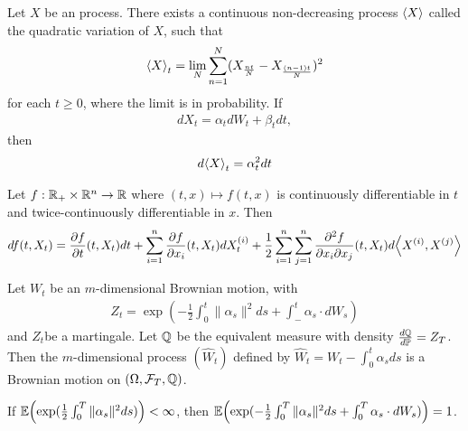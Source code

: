 \begin{thm}
  \label{sec:brown-moti-stoch-9}
  Let $X$ be an \ito process. There exists a continuous non-decreasing
  process $\IP{X}$ called the quadratic variation of $X$, such that
  \begin{align}
    \label{eq:18}
    \IP{X}_{t} = \lim_{N} \sum_{n=1}^{N} (X_{\frac{nt}{N}} - X_{\frac{(n-1)t}{N}})^{2}
  \end{align} for each $t \geq 0$, where the limit is in probability.
  If
  \begin{align}
    \label{eq:19}
    dX_{t} = \alpha_{t} dW_{t} + \beta_{t} dt,
  \end{align} then
  \begin{align}
    \label{eq:20}
    d \IP{X}_{t} = \alpha_{t}^{2} dt
  \end{align}
\end{thm}

\begin{thm}
  \label{sec:brown-moti-stoch-10}
  Let $f : \mathbb{R}_{+} \times \mathbb{R}^{n} \rightarrow \mathbb{R}$ where $(t, x) \mapsto
  f(t, x)$ is continuously differentiable in $t$ and
  twice-continuously differentiable in $x$.  Then
  \begin{align}
    \label{eq:21}
    df(t, X_{t}) = \frac{\partial f}{\partial t} (t, X_{t}) dt +
    \sum_{i=1}^{n} \frac{\partial f}{\partial x_{i}} (t, X_{t})
    dX_{t}^{(i)} + \frac{1}{2} \sum_{i=1}^{n} \sum_{j=1}^{n}
    \frac{\partial^{2} f}{\partial x_{i} \partial x_{j}}(t, X_{t}) d
    \IP{X^{(i)}, X^{(j)}}
  \end{align}
\end{thm}

\begin{thm}
  \label{sec:brown-moti-stoch-11}
  Let $W_{t}$ be an $m$-dimensional Brownian motion, with
  \begin{align}
    \label{eq:22}
    Z_{t} = \exp(-\frac{1}{2} \int_{0}^{t} \| \alpha_{s} \|^{2} ds +
    \int_{-}^{t} \alpha_{s} \cdot dW_{s})
  \end{align} and $Z_{t}$be a martingale.  Let $\Q$ be the equivalent
  measure with density $\frac{d\Q}{d\Prob} = Z_{T}$.  Then the
  $m$-dimensional process $(\hat W_{t})$ defined by $\hat W_{t} =
  W_{t} - \int_{0}^{t} \alpha_{s} ds$ is a Brownian motion on
  $(\Omega, \mathcal{F}_{T}, \Q)$.
\end{thm}

\begin{thm}
  \label{sec:brown-moti-stoch-12}
  If $\E{\exp(\frac{1}{2} \int_{0}^{T} \| \alpha_{s} \|^{2} ds)} <
  \infty$, then $\E{\exp(-\frac{1}{2} \int_{0}^{T} \|\alpha_{s}\|^{2}
    ds + \int_{0}^{T} \alpha_{s} \cdot dW_{s})} = 1$.
\end{thm}

